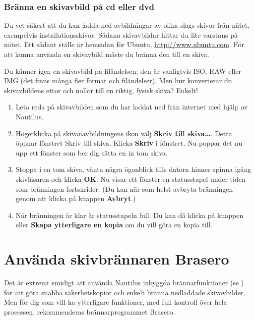 \documentclass[a4paper,final]{memoir} %
\begin{document}

\subsubsection{Bränna en skivavbild på cd eller dvd}\label{nautilus-branna-avbild}


Du vet säkert att du kan ladda ned avbildningar av olika slags skivor från nätet, exempelvis installationsskivor. Sådana skivavbildar hittar du lite varstans på nätet. Ett sådant ställe är hemsidan för Ubuntu, \url{http://www.ubuntu.com}. För att kunna använda en skivavbild måste du bränna den till en skiva.

Du känner igen en skivavbild på filändelsen: den är vanligtvis ISO, RAW eller IMG (det finns många fler format och filändelser). Men hur konverterar du skivavbildens ettor och nollor till en riktig, fysisk skiva? Enkelt!

\begin{enumerate}

\item Leta reda på skivavbilden som du har laddat ned från internet med hjälp av Nautilus. 
\item Högerklicka på skivanavbildningens ikon välj \textbf{Skriv till skiva\ldots{}}. Detta öppnar fönstret Skriv till skiva. Klicka \textbf{Skriv} i fönstret. Nu poppar det nu upp ett fönster som ber dig sätta en in tom skiva. 
\item Stoppa i en tom skiva, vänta några ögonblick tills datorn hinner spinna igång skivläsaren och klicka \textbf{OK}. Nu visar ett fönster en statusstapel under tiden som bränningen fortskrider. (Du kan när som helst avbryta bränningen genom att klicka på knappen \textbf{Avbryt}.)
\item När bränningen är klar är statusstapeln full. Du kan då klicka på knappen \xstang{} eller \textbf{Skapa ytterligare en kopia} om du vill göra en kopia till.

\end{enumerate}


\section{Använda skivbrännaren Brasero}\label{sec:brasero}

Det är extremt smidigt att använda Nautilus inbyggda brännarfunktioner (se ) för att göra snabba säkerhetskopior och enkelt bränna nedladdade skivavbilder. Men för dig som vill ha ytterligare funktioner, med full kontroll över hela processen, rekommenderas brännarprogrammet Brasero.
\end{document}
